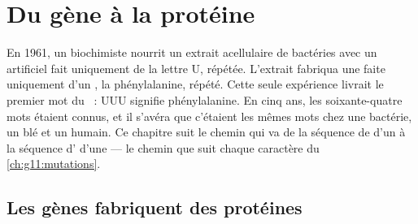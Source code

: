 \chapter{Du gène à la protéine}\label{ch:g11:gene-expression}

En 1961, un biochimiste nourrit un extrait acellulaire de bactéries
avec un  artificiel fait uniquement de la lettre U, répétée.
L'extrait fabriqua une  faite uniquement d'un , la
phénylalanine, répété. Cette seule expérience livrait le premier mot du
~: UUU signifie phénylalanine. En cinq ans, les
soixante-quatre mots étaient connus, et il s'avéra que c'étaient les
mêmes mots chez une bactérie, un blé et un humain. Ce chapitre suit le
chemin qui va de la séquence de  d'un  à la séquence
d' d'une  --- le chemin que suit chaque caractère
du \cref{ch:g11:mutations}.

\section{Les gènes fabriquent des protéines}

